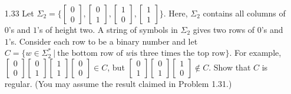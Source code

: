 \begin{enumerate}
\item [1.33]
Let $\Sigma_2 = \Biggl \{ \begin{bmatrix}0 \\0\end{bmatrix} , \begin{bmatrix}0 \\1\end{bmatrix} , \begin{bmatrix}1\\ 0\end{bmatrix}, \begin{bmatrix}1 \\1\end{bmatrix} \Biggl\}$. Here, $\Sigma_2$ contains all columns of $0$'s and $1$'s of height two. A string of symbols in $\Sigma_2$ gives two rows of $0$'s and $1$'s. Consider each row to be a binary number and let $C =\{w \in \Sigma^\ast_2~|~\text{the bottom row of }w \text{is three times the top row}\}$. For example, $\begin{bmatrix}0 \\0 \end{bmatrix}\begin{bmatrix}0\\ 1 \end{bmatrix}\begin{bmatrix}1 \\1 \end{bmatrix}\begin{bmatrix}0 \\0\end{bmatrix} \in C$, but $\begin{bmatrix}0 \\1\end{bmatrix} \begin{bmatrix}0\\ 1\end{bmatrix} \begin{bmatrix}1\\ 0\end{bmatrix} \notin C$. Show that $C$ is regular. (You may assume the result claimed in Problem 1.31.)

\end{enumerate}
